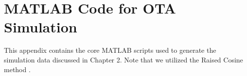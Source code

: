 \documentclass[Markos_Delaportas_1316.tex]{subfiles}
\begin{document}
\section{MATLAB Code for OTA Simulation}

This appendix contains the core MATLAB scripts used to generate the simulation data discussed in Chapter 2. Note that we utilized the Raised Cosine method \cite{sahin_survey_2023}.


\ifSubfilesClassLoaded{
    \clearpage
    \printbibliography
}{}
\end{document}

